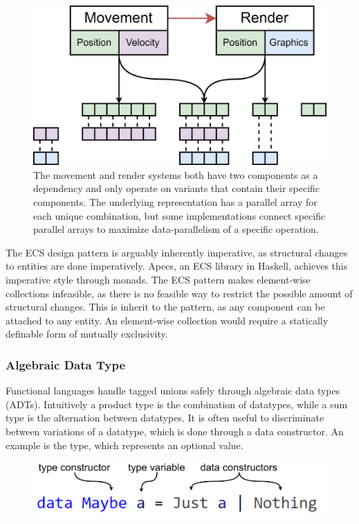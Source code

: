 \documentclass{article}
\newcommand{\type}[1]{\smash{\colorbox{codegray}{\texttt{#1}}}}
\begin{document}
\begin{figure}[ht]
    \centering
    \includegraphics[scale=0.10]{ECSexample.png}
    \caption
    { 
        The movement and render systems both have two components as a dependency and only operate on variants that contain their specific components.
        The underlying representation has a parallel array for each unique combination, but some implementations connect specific parallel arrays to maximize data-parallelism of a specific operation. 
    }
\end{figure}

The ECS design pattern is arguably inherently imperative, as structural changes to entities are done imperatively.
Apecs, an ECS library in Haskell, achieves this imperative style through monads\cite{ecs-apecs}.
The ECS pattern makes element-wise collections infeasible, as there is no feasible way to restrict the possible amount of structural changes.
This is inherit to the pattern, as any component can be attached to any entity.
An element-wise collection would require a statically definable form of mutually exclusivity.

\newpage

\subsubsection{Algebraic Data Type}

Functional languages handle tagged unions safely through algebraic data types (ADTs).
Intuitively a product type is the combination of datatypes, while a sum type is the alternation between datatypes.
It is often useful to discriminate between variations of a datatype, which is done through a data constructor.
An example is the \type{Maybe a} type, which represents an optional value. 

\begin{figure}[ht]
    \hspace{1em}
    \includegraphics[scale=0.05]{InterfaceCode1Annotated.png}
\end{figure}
\end{document}
